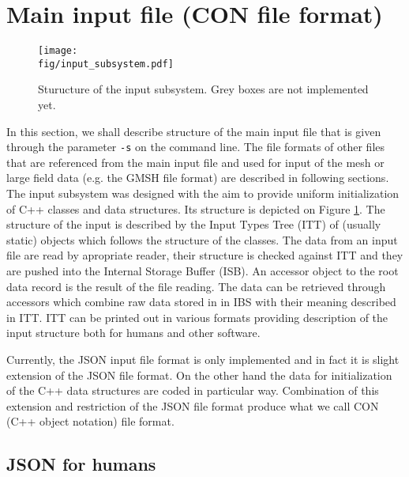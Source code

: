 

\section{Main input file (CON file format)}
\label{sec:CONformat}

\begin{figure}
 \begin{center}
 \texttt{[image: \\fig/input\_subsystem.pdf]}
 \caption{Sturucture of the input subsystem. Grey boxes are not implemented yet.}
 \label{fig:input_subsystem}
 \end{center}
\end{figure}

In this section, we shall describe structure of the main input file that is given through the parameter \verb'-s' on the command line.
The file formats of other files that are referenced from the main input file and used for input of the mesh or large field data
(e.g. the GMSH file format) are described in following sections. The input subsystem was designed with the aim to provide uniform initialization of 
C++ classes and data structures. Its structure is depicted on Figure \ref{fig:input_subsystem}.
The structure of the input is described by the Input Types Tree (ITT) of (usually static) objects which follows the structure of the classes.
The data from an input file are read by apropriate reader, their structure is checked against ITT and they are pushed into the Internal Storage Buffer (ISB).
An accessor object to the root data record is the result of the file reading. The data can be retrieved through accessors which combine 
raw data stored in in IBS with their meaning described in ITT. ITT can be printed out in various formats providing description of the input structure both for 
humans and other software.

Currently, the JSON input file format is only implemented and in fact it is slight extension of the JSON file format. On the other hand
the data for initialization of the C++ data structures are coded in particular way. Combination of this extension and restriction of the JSON file format produce 
what we call CON (C++ object notation) file format.


\subsection{JSON for humans}


